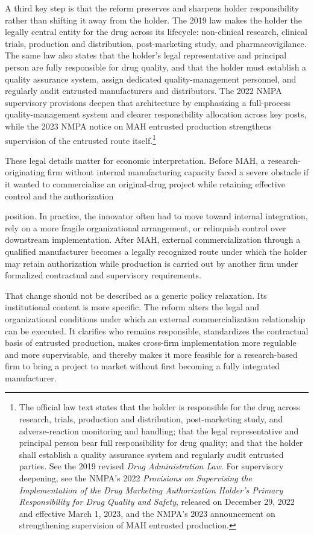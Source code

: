 \documentclass[12pt]{article}
\begin{document}
A third key step is that the reform preserves and sharpens holder responsibility rather than shifting it away from the holder. The 2019 law makes the holder the legally central entity for the drug across its lifecycle: non-clinical research, clinical trials, production and distribution, post-marketing study, and pharmacovigilance. The same law also states that the holder's legal representative and principal person are fully responsible for drug quality, and that the holder must establish a quality assurance system, assign dedicated quality-management personnel, and regularly audit entrusted manufacturers and distributors. The 2022 NMPA supervisory provisions deepen that architecture by emphasizing a full-process quality-management system and clearer responsibility allocation across key posts, while the 2023 NMPA notice on MAH entrusted production strengthens supervision of the entrusted route itself.\footnote{The official law text states that the holder is responsible for the drug across research, trials, production and distribution, post-marketing study, and adverse-reaction monitoring and handling; that the legal representative and principal person bear full responsibility for drug quality; and that the holder shall establish a quality assurance system and regularly audit entrusted parties. See the 2019 revised \textit{Drug Administration Law}. For supervisory deepening, see the NMPA's 2022 \textit{Provisions on Supervising the Implementation of the Drug Marketing Authorization Holder's Primary Responsibility for Drug Quality and Safety}, released on December 29, 2022 and effective March 1, 2023, and the NMPA's 2023 announcement on strengthening supervision of MAH entrusted production.}

These legal details matter for economic interpretation. Before MAH, a research-originating firm without internal manufacturing capacity faced a severe obstacle if it wanted to commercialize an original-drug project while retaining effective control and the authorization

position. In practice, the innovator often had to move toward internal integration, rely on a more fragile organizational arrangement, or relinquish control over downstream implementation. After MAH, external commercialization through a qualified manufacturer becomes a legally recognized route under which the holder may retain authorization while production is carried out by another firm under formalized contractual and supervisory requirements.

That change should not be described as a generic policy relaxation. Its institutional content is more specific. The reform alters the legal and organizational conditions under which an external commercialization relationship can be executed. It clarifies who remains responsible, standardizes the contractual basis of entrusted production, makes cross-firm implementation more regulable and more supervisable, and thereby makes it more feasible for a research-based firm to bring a project to market without first becoming a fully integrated manufacturer.
\end{document}
